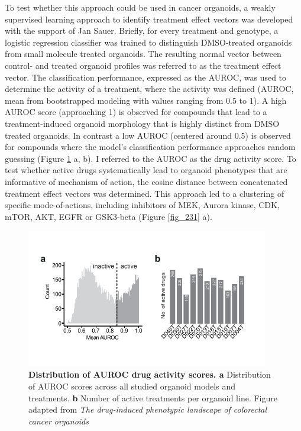 \begin{flushleft}
\bigbreak
To test whether this approach could be used in cancer organoids, a weakly supervised learning approach to identify treatment effect vectors was developed with the support of Jan Sauer. Briefly, for every treatment and genotype, a logistic regression classifier was trained to distinguish DMSO-treated organoids from small molecule treated organoids. The resulting normal vector between control- and treated organoid profiles was referred to as the treatment effect vector. The classification performance, expressed as the AUROC, was used to determine the activity of a treatment, where the activity was defined  (AUROC, mean from bootstrapped modeling with values ranging from 0.5 to 1). A high AUROC score (approaching 1) is observed for compounds that lead to a treatment-induced organoid morphology that is highly distinct from DMSO treated organoids. In contrast a low AUROC (centered around 0.5) is observed for compounds where the model's classification performance approaches random guessing (Figure \ref{fig_230} a, b). I referred to the AUROC as the drug activity score. To test whether active drugs systematically lead to organoid phenotypes that are informative of mechanism of action, the cosine distance between concatenated treatment effect vectors was determined. This approach led to a clustering of specific mode-of-actions, including inhibitors of MEK, Aurora kinase, CDK, mTOR, AKT, EGFR or GSK3-beta (Figure \ref{fig_231} a). 

\begin{figure}[!h]
\centering
\includegraphics[width=300pt,
                height=\textheight,
                keepaspectratio]{figures/promise/pdf/fig_3_0_1.pdf}
\caption[Distribution of AUROC drug activity scores]{\textbf{Distribution of AUROC drug activity scores. a} Distribution of AUROC scores across all studied organoid models and treatments. \textbf{b} Number of active treatments per organoid line. Figure adapted from \textit{The drug-induced phenotypic landscape of colorectal cancer organoids} \parencite{betgeDruginducedPhenotypicLandscape2022}}
\label{fig_230}
\end{figure}
\bigbreak



\end{flushleft}
